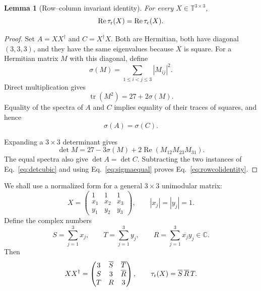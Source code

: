 \documentclass[aps,prx,reprint,nofootinbib,twoside,superscriptaddress,longbibliography,floatfix]{revtex4-2}
\newtheorem{lemma}[theorem]{Lemma}
\theoremstyle{definition}
\newcommand{\T}{\mathbb T}
\newcommand{\C}{\mathbb C}
\newcommand{\tr}{\operatorname{tr}}
\newcommand{\RePart}{\operatorname{Re}}
\begin{document}
\begin{lemma}[Row--column invariant identity]
\label{lem:rowcolumn}
For every $X\in\T^{3\times3}$,
\begin{equation}
\RePart\tau_{\rm r}(X)=\RePart\tau_{\rm c}(X).
\label{eq:rowcolidentity}
\end{equation}
\end{lemma}

\begin{proof}
Set $A=XX^{\dagger}$ and $C=X^{\dagger}X$.  Both are Hermitian, both have diagonal $(3,3,3)$, and they have the same eigenvalues because $X$ is square. For a Hermitian matrix $M$ with this diagonal, define
\begin{equation}
\sigma(M)=\sum_{1\leq i<j\leq3}|M_{ij}|^2.
\label{eq:sigmam}
\end{equation}
Direct multiplication gives
\begin{equation}
\tr(M^2)=27+2\sigma(M).
\label{eq:tracem2}
\end{equation}
Equality of the spectra of $A$ and $C$ implies equality of their traces of squares, and hence
\begin{equation}
\sigma(A)=\sigma(C).
\label{eq:sigmaequal}
\end{equation}

Expanding a $3\times3$ determinant gives
\begin{equation}
\det M=27-3\sigma(M)
+2\RePart\!\left(M_{12}M_{23}M_{31}\right).
\label{eq:detcubic}
\end{equation}
The equal spectra also give $\det A=\det C$.  Subtracting the two instances of Eq.~\eqref{eq:detcubic} and using Eq.~\eqref{eq:sigmaequal} proves Eq.~\eqref{eq:rowcolidentity}.
\end{proof}

We shall use a normalized form for a general $3\times3$ unimodular matrix:
\begin{equation}
X=\begin{pmatrix}
1&1&1\\
x_1&x_2&x_3\\
y_1&y_2&y_3
\end{pmatrix},
\qquad |x_j|=|y_j|=1.
\label{eq:normalizedx}
\end{equation}
Define the complex numbers
\begin{equation}
S=\sum_{j=1}^{3}x_j,\qquad T=\sum_{j=1}^{3}y_j,\qquad
R=\sum_{j=1}^{3}\overline{x_j}y_j\in\C.
\label{eq:STR}
\end{equation}
Then
\begin{equation}
XX^{\dagger}=
\begin{pmatrix}
3&\overline S&\overline T\\
S&3&\overline R\\
T&R&3
\end{pmatrix},
\qquad
\tau_{\rm r}(X)=\overline S\,\overline R\,T.
\label{eq:gramSTR}
\end{equation}
\end{document}
